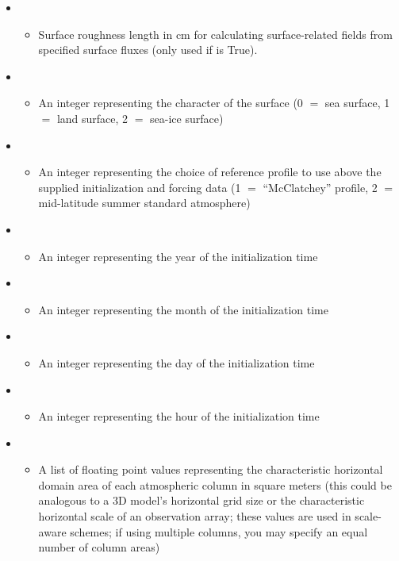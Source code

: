 \begin{itemize}
\begin{itemize}
	\end{itemize}
\item {}
	\begin{itemize}
	\item Surface roughness length in cm for calculating surface-related fields from specified surface fluxes (only used if  is True).
	\end{itemize}
\item {}
	\begin{itemize}
	\item An integer representing the character of the surface (0 $=$ sea surface, 1 $=$ land surface, 2 $=$ sea-ice surface)
	\end{itemize}
\item {}
	\begin{itemize}
	\item An integer representing the choice of reference profile to use above the supplied initialization and forcing data (1 $=$ ``McClatchey'' profile, 2 $=$ mid-latitude summer standard atmosphere)
	\end{itemize}
\item {}
	\begin{itemize}
	\item An integer representing the year of the initialization time
	\end{itemize}
\item {}
	\begin{itemize}
	\item An integer representing the month of the initialization time
	\end{itemize}
\item {}
	\begin{itemize}
	\item An integer representing the day of the initialization time
	\end{itemize}
\item {}
	\begin{itemize}
	\item An integer representing the hour of the initialization time
	\end{itemize}
\item {}
	\begin{itemize}
	\item A list of floating point values representing the characteristic horizontal domain area of each atmospheric column in square meters (this could be analogous to a 3D model's horizontal grid size or the characteristic horizontal scale of an observation array; these values are used in scale-aware schemes; if using multiple columns, you may specify an equal number of column areas)

\end{itemize}
\end{itemize}
